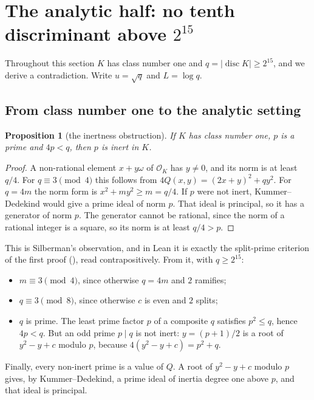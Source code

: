 \documentclass[11pt]{article}
\newtheorem{proposition}[theorem]{Proposition}
\theoremstyle{definition}
\newcommand{\OK}{\mathcal{O}_K}
\newcommand{\disc}{\operatorname{disc}}
\begin{document}
\section{The analytic half: no tenth discriminant above \texorpdfstring{$2^{15}$}{2\^{}15}}\label{sec:argument}

Throughout this section $K$ has class number one and $q = |\disc K| \ge 2^{15}$, and we derive a contradiction. Write $u = \sqrt q$ and $L = \log q$.

\subsection{From class number one to the analytic setting}\label{sec:setting}

\begin{proposition}[the inertness obstruction]\label{prop:obstruction}
If $K$ has class number one, $p$ is a prime and $4p < q$, then $p$ is inert in $K$.
\end{proposition}

\begin{proof}
A non-rational element $x + y\omega$ of $\OK$ has $y \ne 0$, and its norm is at least $q/4$. For $q \equiv 3 \pmod 4$ this follows from $4Q(x,y) = (2x + y)^2 + qy^2$. For $q = 4m$ the norm form is $x^2 + my^2 \ge m = q/4$. If $p$ were not inert, Kummer--Dedekind would give a prime ideal of norm $p$. That ideal is principal, so it has a generator of norm $p$. The generator cannot be rational, since the norm of a rational integer is a square, so its norm is at least $q/4 > p$.
\end{proof}

This is Silberman's observation, and in Lean it is exactly the split-prime criterion of the first proof (), read contrapositively. From it, with $q \ge 2^{15}$:
\begin{itemize}[nosep]
\item $m \equiv 3 \pmod 4$, since otherwise $q = 4m$ and $2$ ramifies;
\item $q \equiv 3 \pmod 8$, since otherwise $c$ is even and $2$ splits;
\item $q$ is prime. The least prime factor $p$ of a composite $q$ satisfies $p^2 \le q$, hence $4p < q$. But an odd prime $p \mid q$ is not inert: $y = (p+1)/2$ is a root of $y^2 - y + c$ modulo $p$, because $4(y^2 - y + c) = p^2 + q$.
\end{itemize}
Finally, every non-inert prime is a value of $Q$. A root of $y^2 - y + c$ modulo $p$ gives, by Kummer--Dedekind, a prime ideal of inertia degree one above $p$, and that ideal is principal.
\end{document}
